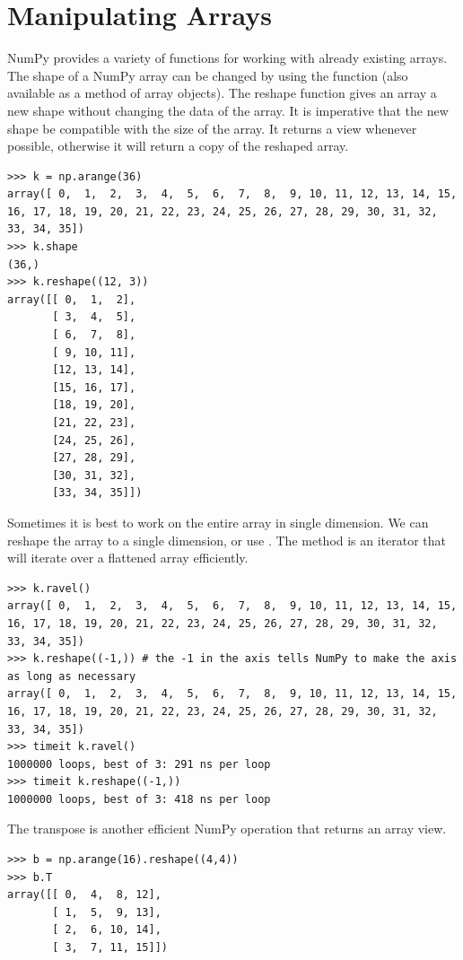 \section*{Manipulating Arrays} NumPy provides a variety of functions for
working with already existing arrays. The shape of a NumPy array can be
changed by using the  function (also available as a
method of array objects). The reshape function gives an array a new
shape without changing the data of the array. It is imperative that 
the new shape be compatible with the size of the array. 
It returns a view whenever possible, otherwise it will return 
a copy of the reshaped array.
\begin{lstlisting}
>>> k = np.arange(36)
array([ 0,  1,  2,  3,  4,  5,  6,  7,  8,  9, 10, 11, 12, 13, 14, 15, 16, 17, 18, 19, 20, 21, 22, 23, 24, 25, 26, 27, 28, 29, 30, 31, 32, 33, 34, 35])
>>> k.shape
(36,)
>>> k.reshape((12, 3))
array([[ 0,  1,  2],
       [ 3,  4,  5],
       [ 6,  7,  8],
       [ 9, 10, 11],
       [12, 13, 14],
       [15, 16, 17],
       [18, 19, 20],
       [21, 22, 23],
       [24, 25, 26],
       [27, 28, 29],
       [30, 31, 32],
       [33, 34, 35]])
\end{lstlisting} 
Sometimes it is best to work on the entire array in single dimension. 
We can reshape the array to a single dimension, or use . 
The  method is an iterator that will iterate over a 
flattened array efficiently.
\begin{lstlisting}
>>> k.ravel()
array([ 0,  1,  2,  3,  4,  5,  6,  7,  8,  9, 10, 11, 12, 13, 14, 15, 16, 17, 18, 19, 20, 21, 22, 23, 24, 25, 26, 27, 28, 29, 30, 31, 32, 33, 34, 35])
>>> k.reshape((-1,)) # the -1 in the axis tells NumPy to make the axis as long as necessary
array([ 0,  1,  2,  3,  4,  5,  6,  7,  8,  9, 10, 11, 12, 13, 14, 15, 16, 17, 18, 19, 20, 21, 22, 23, 24, 25, 26, 27, 28, 29, 30, 31, 32, 33, 34, 35])
>>> timeit k.ravel()
1000000 loops, best of 3: 291 ns per loop
>>> timeit k.reshape((-1,))
1000000 loops, best of 3: 418 ns per loop 
\end{lstlisting} 
The transpose is another efficient NumPy operation that returns an array
view. 

\begin{lstlisting}
>>> b = np.arange(16).reshape((4,4)) 
>>> b.T
array([[ 0,  4,  8, 12],
       [ 1,  5,  9, 13],
       [ 2,  6, 10, 14],
       [ 3,  7, 11, 15]])
\end{lstlisting}

